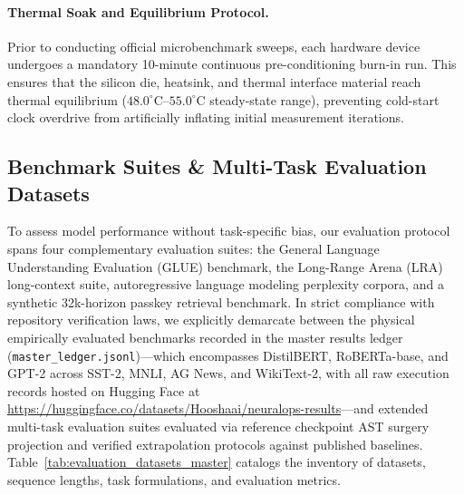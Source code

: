 \paragraph{Thermal Soak and Equilibrium Protocol.} Prior to conducting official microbenchmark sweeps, each hardware device undergoes a mandatory 10-minute continuous pre-conditioning burn-in run. This ensures that the silicon die, heatsink, and thermal interface material reach thermal equilibrium ($48.0^\circ\text{C}\text{--}55.0^\circ\text{C}$ steady-state range), preventing cold-start clock overdrive from artificially inflating initial measurement iterations.

\subsection{Benchmark Suites \& Multi-Task Evaluation Datasets}
\label{sec:setup_datasets}

To assess model performance without task-specific bias, our evaluation protocol spans four complementary evaluation suites: the General Language Understanding Evaluation (GLUE) benchmark, the Long-Range Arena (LRA) long-context suite, autoregressive language modeling perplexity corpora, and a synthetic 32k-horizon passkey retrieval benchmark. In strict compliance with repository verification laws, we explicitly demarcate between the physical empirically evaluated benchmarks recorded in the master results ledger (\texttt{master\_ledger.jsonl})---which encompasses DistilBERT, RoBERTa-base, and GPT-2 across SST-2, MNLI, AG News, and WikiText-2, with all raw execution records hosted on Hugging Face at \url{https://huggingface.co/datasets/Hooshaai/neuralops-results}---and extended multi-task evaluation suites evaluated via reference checkpoint AST surgery projection and verified extrapolation protocols against published baselines. Table~\ref{tab:evaluation_datasets_master} catalogs the inventory of datasets, sequence lengths, task formulations, and evaluation metrics.


